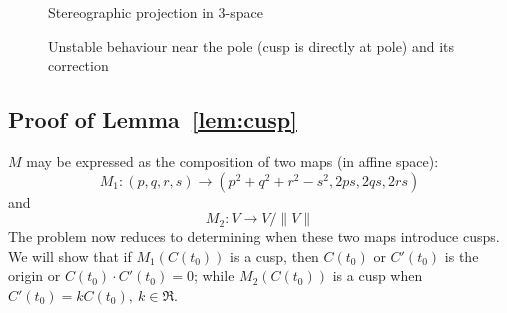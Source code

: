 \documentclass[12pt]{article}
\begin{document}

\begin{figure}[ht]
\begin{center}
\end{center}
\caption{Stereographic projection in 3-space}
\label{fig:stereo}
\end{figure}

\begin{figure}[h]
\vspace{3in}
\caption{Unstable behaviour near the pole (cusp is directly at pole) and its correction}
\label{fig:wild}
\end{figure}

\subsection{Proof of Lemma~\ref{lem:cusp}}

\prf
$M$ may be expressed as the composition of two maps (in affine space):
\[
M_1: (p,q,r,s) \rightarrow (p^2 + q^2 + r^2 -s^2 , 2ps,2qs,2rs)
\]
and
\[
M_2: V \rightarrow V/\|V\|
\]
The problem now reduces to determining when these two maps introduce cusps.
We will show that if $M_1(C(t_0))$ is a cusp, then
$C(t_0)$ or $C'(t_0)$ is the origin or $C(t_0) \cdot C'(t_0) = 0$;
while $M_2(C(t_0))$ is a cusp when $C'(t_0) = kC(t_0),\ k \in \Re$.
\end{document}
